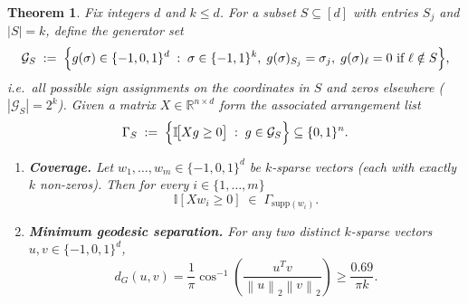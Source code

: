 \documentclass{article} %
\newcommand{\twonorm}[1]{\left\|#1\right\|_{2}}
\newtheorem{theorem}{Theorem}
\newcommand{\1}{\ensuremath{{\sf (i)}}}
\newcommand{\2}{\ensuremath{{\sf (ii)}}}
\newcommand{\3}{\ensuremath{{\sf (iii)}}}
\newcommand{\4}{\ensuremath{{\sf (iv)}}}
\newcommand{\5}{\ensuremath{{\sf (v)}}}
\newcommand{\6}{\ensuremath{{\sf (vi)}}}
\begin{document}
\begin{theorem}
Fix integers \(d\) and \(k\le d\).
For a subset $S \subseteq [d]$ with entries $S_j$ and $|S| = k$, define the
\emph{generator set}
\[
\mathcal G_{S}
\;:=\;
\Bigl\{
      g(\sigma)\in\{-1,0,1\}^{d}\;:\;
      \sigma\in\{-1,1\}^{k},
      \;g(\sigma)_{S_{j}}=\sigma_{j},\;
      g(\sigma)_{\ell}=0\text{ if }\ell\notin S
\Bigr\},
\]
i.e.\ all possible sign assignments on the coordinates in \(S\) and zeros elsewhere
(\(|\mathcal G_{S}|=2^{k}\)).
Given a matrix \(X\in\mathbb{R}^{n\times d}\) form the associated
\emph{arrangement list}
\[
\Gamma_{S}
\;:=\;
\Bigl\{
      \mathbb I\!\bigl[Xg\ge 0\bigr]\;:\;g\in\mathcal G_{S}
\Bigr\}
\subseteq\{0,1\}^{n}.
\]

\begin{enumerate}
\item[\textup{(i)}] \textbf{Coverage.}\;
      Let \(w_{1},\dots ,w_{m}\in\{-1,0,1\}^{d}\) be
      \(k\)-sparse vectors (each with exactly \(k\) non-zeros).
      Then for every \(i\in\{1,\dots ,m\}\)
      \[
        \mathbb I[Xw_{i}\ge 0]\;\in\;\Gamma_{\text{supp}(w_{i})}.
      \]

\item[\textup{(ii)}] \textbf{Minimum geodesic separation.}\;
      For any two distinct \(k\)-sparse vectors
      \(u,v\in\{-1,0,1\}^{d}\),
      \[
        d_G(u, v) = \frac{1}{\pi}\cos^{-1}\left(\frac{u^Tv}{\twonorm{u}\twonorm{v}} \right) \geq \frac{0.69}{\pi k}.
      \]
\end{enumerate}
\end{theorem}
\end{document}
